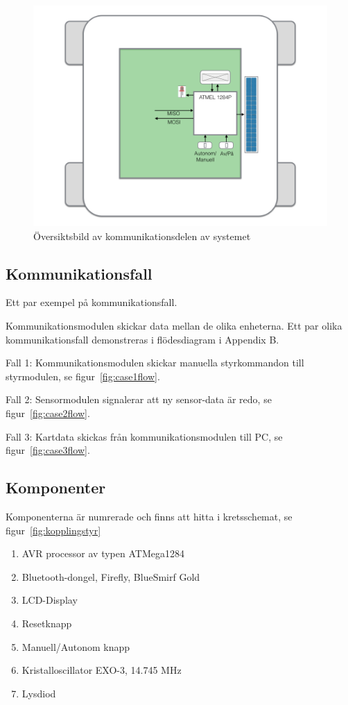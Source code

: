 \documentclass[a4paper,12pt,fleqn]{article}
\begin{document}
\begin{figure}[htp] %
  \begin{center}
  \includegraphics[keepaspectratio=true,width=\linewidth]{bilder/kom_overview.png}  %
  \end{center}
  \caption{Översiktsbild av kommunikationsdelen av systemet} %
  \label{fig:overviewKom}
\end{figure}
\newpage
\subsection{Kommunikationsfall}
Ett par exempel på kom\-mun\-ikations\-fall.

Kommunikationsmodulen skickar data mellan de olika enheterna. Ett par olika kommunikationsfall demonstreras i flödesdiagram i Appendix B.

Fall 1: Kommunikationsmodulen skickar manuella styrkommandon till styrmodulen, se figur~\ref{fig:case1flow}.

Fall 2: Sensormodulen signalerar att ny sensor-data är redo, se  figur~\ref{fig:case2flow}.

Fall 3: Kartdata skickas från kommunikationsmodulen till PC, se figur~\ref{fig:case3flow}. 
 
\subsection{Komponenter}
Komponenterna är numrerade och finns att hitta i kretsschemat, se figur~\ref{fig:kopplingstyr}
\begin{enumerate}
  \item AVR processor av typen ATMega1284
  \item Bluetooth-dongel, Firefly, BlueSmirf Gold
  \item LCD-Display
  \item Resetknapp
  \item Manuell/Autonom knapp
  \item Kristalloscillator EXO-3, 14.745 MHz
  \item Lysdiod
\end{enumerate}
\end{document}
